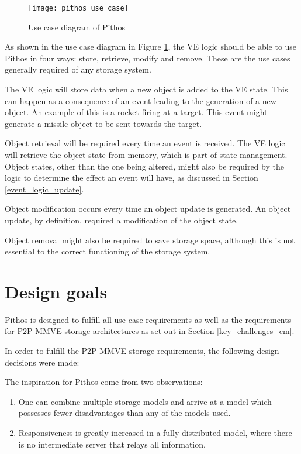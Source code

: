 \begin{figure}[htbp]
 \centering
 \texttt{[image: pithos\_use\_case]}
 \caption{Use case diagram of Pithos}
 \label{fig_pithos_use_case}
\end{figure}

As shown in the use case diagram in Figure \ref{fig_pithos_use_case}, the VE logic should be able to use Pithos in four ways: store, retrieve, modify and remove. These are the use cases generally required of any storage system.

The VE logic will store data when a new object is added to the VE state. This can happen as a consequence of an event leading to the generation of a new object. An example of this is a rocket firing at a target. This event might generate a missile object to be sent towards the target.

Object retrieval will be required every time an event is received. The VE logic will retrieve the object state from memory, which is part of state management. Object states, other than the one being altered, might also be required by the logic to determine the effect an event will have, as discussed in Section \ref{event_logic_update}.

Object modification occurs every time an object update is generated. An object update, by definition, required a modification of the object state.

Object removal might also be required to save storage space, although this is not essential to the correct functioning of the storage system.

\section{Design goals}

Pithos is designed to fulfill all use case requirements as well as the requirements for P2P MMVE storage architectures as set out in Section \ref{key_challenges_cm}.

In order to fulfill the P2P MMVE storage requirements, the following design decisions were made:

The inspiration for Pithos come from two observations:
%
\begin{enumerate}
  \item One can combine multiple storage models and arrive at a model which possesses fewer disadvantages than any of the models used.
  \item Responsiveness is greatly increased in a fully distributed model, where there is no intermediate server that relays all information.
\end{enumerate}


